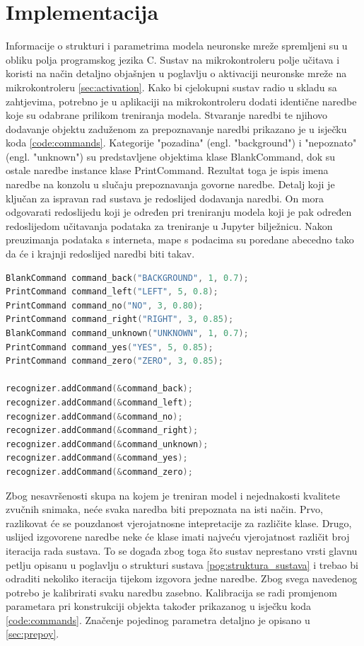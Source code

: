 \chapter{Implementacija}
\label{pog:implement}

Informacije o strukturi i parametrima modela neuronske mreže spremljeni su u obliku polja
programskog jezika C. Sustav na mikrokontroleru polje učitava i koristi na način detaljno objašnjen 
u poglavlju o aktivaciji neuronske mreže na mikrokontroleru \ref{sec:activation}.
Kako bi cjelokupni sustav radio u skladu sa zahtjevima, potrebno je u aplikaciji
na mikrokontroleru dodati identične naredbe koje su odabrane prilikom treniranja
modela. Stvaranje naredbi te njihovo dodavanje objektu zaduženom za prepoznavanje
naredbi prikazano je u isječku koda \ref{code:commands}. Kategorije "pozadina" (engl. "background") i
"nepoznato" (engl. "unknown") su predstavljene objektima klase BlankCommand, dok su ostale naredbe 
instance klase PrintCommand. Rezultat toga je ispis imena naredbe na konzolu u slučaju
prepoznavanja govorne naredbe. Detalj koji je ključan za ispravan rad sustava je redoslijed
dodavanja naredbi. On mora odgovarati redoslijedu koji je određen pri treniranju modela koji
je pak određen redoslijedom učitavanja podataka za treniranje u Jupyter bilježnicu. Nakon
preuzimanja podataka s interneta, mape s podacima su poredane abecedno tako da 
će i krajnji redoslijed naredbi biti takav.

\begin{lstlisting}[language=C++, caption=Stvaranje naredbi, label=code:commands]
BlankCommand command_back("BACKGROUND", 1, 0.7);
PrintCommand command_left("LEFT", 5, 0.8);
PrintCommand command_no("NO", 3, 0.80);
PrintCommand command_right("RIGHT", 3, 0.85);
BlankCommand command_unknown("UNKNOWN", 1, 0.7);
PrintCommand command_yes("YES", 5, 0.85);
PrintCommand command_zero("ZERO", 3, 0.85);

recognizer.addCommand(&command_back);
recognizer.addCommand(&command_left);
recognizer.addCommand(&command_no);
recognizer.addCommand(&command_right);
recognizer.addCommand(&command_unknown);
recognizer.addCommand(&command_yes);
recognizer.addCommand(&command_zero);
\end{lstlisting}

Zbog nesavršenosti skupa na kojem je treniran model i nejednakosti kvalitete
zvučnih snimaka, neće svaka naredba biti prepoznata na isti način. Prvo, razlikovat će
se pouzdanost vjerojatnosne intepretacije za različite klase. Drugo, uslijed izgovorene
naredbe neke će klase imati najveću vjerojatnost različit broj iteracija rada sustava.
To se događa zbog toga što sustav neprestano vrsti glavnu petlju opisanu u poglavlju
o strukturi sustava \ref{pog:struktura_sustava} i trebao bi odraditi nekoliko iteracija tijekom izgovora
jedne naredbe. Zbog svega navedenog potrebo je kalibrirati svaku naredbu zasebno.
Kalibracija se radi promjenom parametara pri konstrukciji objekta također prikazanog 
u isječku koda \ref{code:commands}. Značenje pojedinog parametra detaljno je opisano u 
\ref{sec:prepoy}. 

